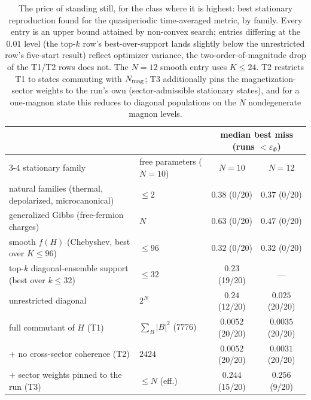 \documentclass[a4paper,11pt,noarxiv]{quantumarticle}
\newcommand{\ephi}{\varepsilon_\Phi}
\begin{document}
\begin{table}[t]
\centering\footnotesize
\begin{tabular}{@{}llcc@{}}
\toprule
& & \multicolumn{2}{c}{median best miss (runs $< \ephi$)} \\
\cmidrule(lr){3-4}
stationary family & free parameters ($N{=}10$) & $N=10$ & $N=12$ \\
\midrule
natural families (thermal, depolarized, microcanonical) & $\leq 2$ &
$0.38$ (0/20) & $0.37$ (0/20) \\
generalized Gibbs (free-fermion charges) & $N$ &
$0.63$ (0/20) & $0.47$ (0/20) \\
smooth $f(H)$ (Chebyshev, best over $K \leq 96$) & $\leq 96$ &
$0.32$ (0/20) & $0.32$ (0/20) \\
top-$k$ diagonal-ensemble support (best over $k \leq 32$) & $\leq 32$ &
$0.23$ (19/20) & --- \\
unrestricted diagonal & $2^N$ &
$0.24$ (12/20) & $0.025$ (20/20) \\
full commutant of $H$ (T1) & $\textstyle\sum_B |B|^2$ ($7776$) &
$0.0052$ (20/20) & $0.0035$ (20/20) \\
\;\;+ no cross-sector coherence (T2) & $2424$ &
$0.0052$ (20/20) & $0.0031$ (20/20) \\
\;\;+ sector weights pinned to the run (T3) & $\leq N$ (eff.) &
$0.244$ (15/20) & $0.256$ (9/20) \\
\bottomrule
\end{tabular}
\caption{The price of standing still, for the class where it is
highest: best stationary reproduction found for the quasiperiodic
time-averaged metric, by family. Every entry is an upper bound
attained by non-convex search; entries differing at the $0.01$ level
(the top-$k$ row's best-over-support lands slightly below the
unrestricted row's five-start result) reflect optimizer variance, the
two-order-of-magnitude drop of the T1/T2 rows does not. The $N{=}12$
smooth entry uses $K \leq 24$. T2 restricts T1 to states commuting
with $N_{\rm mag}$; T3 additionally pins the magnetization-sector
weights to the run's own (sector-admissible stationary states), and
for a one-magnon state this reduces to diagonal populations on the
$N$ nondegenerate magnon levels.}
\label{tab:price}
\end{table}
\end{document}
